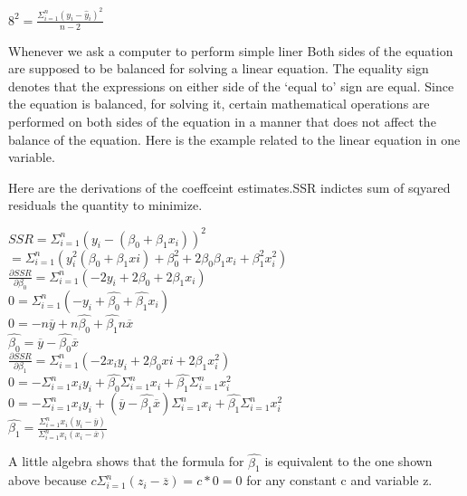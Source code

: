 \documentclass[14pt,a4paper]{article}
\begin{document}
     $ 8^2= \frac{\Sigma_{i=1}^{n}(y_{i} - \widehat{y}_{i}) ^2}{n-2} $
     
     Whenever we ask a computer to perform simple liner Both sides of the equation are supposed to be balanced for solving a linear equation. The equality sign denotes that the expressions on either side of the ‘equal to’ sign are equal. Since the equation is balanced, for solving it, certain mathematical operations are performed on both sides of the equation in a manner that does not affect the balance of the equation. Here is the example related to the linear equation in one variable.
 
    Here are the derivations of the coeffceint estimates.SSR indictes sum of sqyared residuals the quantity to minimize.
    
    $SSR = \Sigma_{i=1}^{n}(y_{i}-(\beta_{0}+\beta_{1}x_{i}))^2$\\
    
   $ =  \Sigma_{i=1}^{n}(y_{i}^2(\beta_{0}+\beta_{1}x{i})+\beta_{0}^2+2\beta_{0}\beta_{1}x_{i}+\beta_{1}^2x_{i}^2) $\\
   
   $\frac{\partial SSR}{\partial \beta_{0}} = \Sigma_{i=1}^{n}(-2y_{i} + 2\beta_{0} + 2\beta_{1}x_{i}) $\\


$0 = \Sigma_{i=1}^{n}(-y_{i}+\widehat{\beta_{0}}+\widehat{\beta_{1}}x_{i}) $\\


$0 = -n\overline{y} + n\widehat{\beta_{0}} + \widehat{\beta_{1}}n\overline{x}$\\

$\widehat{\beta_{0}} = \overline{y} - \widehat{\beta_{0}}\overline{x} $\\
  
  $\frac{\partial SSR}{\partial\beta_{1}} = \Sigma_{i=1}^{n}(-2x_{i}y_{i} + 2\beta_{0}x{i} + 2\beta_{1}x_{i}^2 )$ \\ 
 
 
 $0 = -\Sigma_{i=1}^{n}x_{i}y_{i}+ \widehat{\beta_{0}}\Sigma_{i=1}^{n}x_{i} + \widehat{\beta_{1}}\Sigma_{i=1}^{n}x_{i}^2$\\
 
 $0 = -\Sigma_{i=1}^{n}x_{i}y_{i}+ (\overline{y}-\widehat{\beta_{1}}\overline{x})\Sigma_{i=1}^{n}x_{i}+\widehat{\beta_{1}}\Sigma_{i=1}^{n}x_{i}^2$\\
 
 $\widehat{\beta_{1}} = \frac{\Sigma_{i=1}^{n}x_{i}(y_{i}-\overline{y})}{\Sigma_{i=1}^{n}x_{i}(x_{i}-\overline{x})}$
     
     A little algebra shows that the formula for $\widehat{\beta_{1}}$ is equivalent to the one  shown above because $c\Sigma_{i=1}^{n}(z_{i}-\overline{z}) = c*0 = 0$ for any constant c and variable z.
     
  
     
\end{document}
